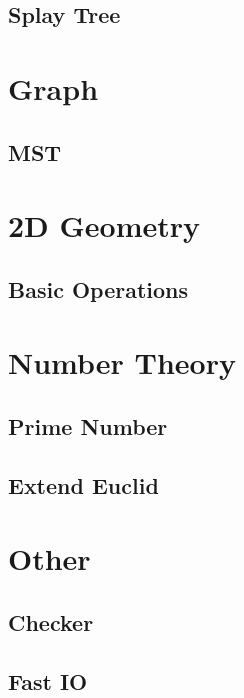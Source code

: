 \documentclass[twoside]{article}
\begin{document}
		\subsection{Splay Tree}
			
	\newpage
	\section{Graph}
		\subsection{MST}
	\newpage
	\section{2D Geometry}
		\subsection{Basic Operations}
			
	\newpage
	\section{Number Theory}
		\subsection{Prime Number}
			
		\subsection{Extend Euclid}
			
	\newpage
	\section{Other}
		\subsection{Checker}
			
		\subsection{Fast IO}
			
\end{document}

